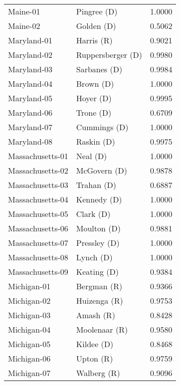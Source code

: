 \begin{longtable}{llr}
          Maine-01 &          Pingree (D) &       1.0000 \\
          Maine-02 &           Golden (D) &       0.5062 \\
       Maryland-01 &           Harris (R) &       0.9021 \\
       Maryland-02 &    Ruppersberger (D) &       0.9980 \\
       Maryland-03 &         Sarbanes (D) &       0.9984 \\
       Maryland-04 &            Brown (D) &       1.0000 \\
       Maryland-05 &            Hoyer (D) &       0.9995 \\
       Maryland-06 &            Trone (D) &       0.6709 \\
       Maryland-07 &         Cummings (D) &       1.0000 \\
       Maryland-08 &           Raskin (D) &       0.9975 \\
  Massachusetts-01 &             Neal (D) &       1.0000 \\
  Massachusetts-02 &         McGovern (D) &       0.9878 \\
  Massachusetts-03 &           Trahan (D) &       0.6887 \\
  Massachusetts-04 &          Kennedy (D) &       1.0000 \\
  Massachusetts-05 &            Clark (D) &       1.0000 \\
  Massachusetts-06 &          Moulton (D) &       0.9881 \\
  Massachusetts-07 &         Pressley (D) &       1.0000 \\
  Massachusetts-08 &            Lynch (D) &       1.0000 \\
  Massachusetts-09 &          Keating (D) &       0.9384 \\
       Michigan-01 &          Bergman (R) &       0.9366 \\
       Michigan-02 &         Huizenga (R) &       0.9753 \\
       Michigan-03 &            Amash (R) &       0.8428 \\
       Michigan-04 &        Moolenaar (R) &       0.9580 \\
       Michigan-05 &           Kildee (D) &       0.8468 \\
       Michigan-06 &            Upton (R) &       0.9759 \\
       Michigan-07 &          Walberg (R) &       0.9096 \\

\end{longtable}
